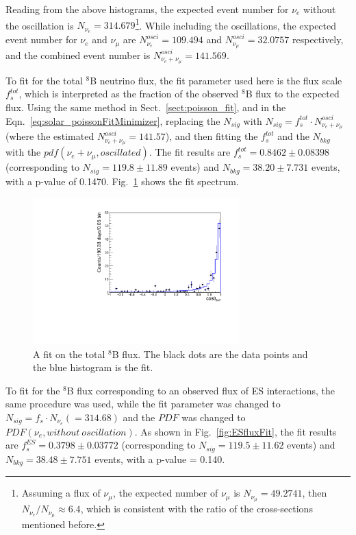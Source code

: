 Reading from the above histograms, the expected event number for $\nu_e$ without the oscillation is $N_{\nu_e} = 314.679$\footnote{Assuming a flux of $\nu_\mu$, the expected number of $\nu_\mu$ is $N_{\nu_\mu}=49.2741$, then $N_{\nu_e}/N_{\nu_\mu}\approx 6.4$, which is consistent with the ratio of the cross-sections mentioned before.}. While including the oscillations, the expected event number for $\nu_e$ and $\nu_\mu$ are $N^{osci}_{\nu_e} = 109.494$ and $N^{osci}_{\nu_\mu} = 32.0757$ respectively, and the combined event number is $N^{osci}_{\nu_e+\nu_\mu}=141.569$. %
 
To fit for the total $^8$B neutrino flux, the fit parameter used here is the flux scale $f^{tot}_s$, which is interpreted as the fraction of the observed $^8$B flux to the expected flux. Using the same method in Sect.~\ref{sect:poisson_fit}, and in the Eqn.~\ref{eq:solar_poissonFitMinimizer}, replacing the $N_{sig}$ with $N_{sig}=f^{tot}_s\cdot N^{osci}_{\nu_e+\nu_\mu}$(where the estimated $N^{osci}_{\nu_e+\nu_\mu}=141.57$), and then fitting the $f^{tot}_s$ and the $N_{bkg}$ with the $pdf(\nu_e+\nu_\mu,oscillated)$. The fit results are $f^{tot}_s=0.8462\pm 0.08398$ (corresponding to $N_{sig}=119.8\pm11.89$ events) and $N_{bkg}=38.20\pm7.731$ events, with a p-value of 0.1470. Fig.~\ref{fig:TOTALfluxFit} shows the fit spectrum.

\begin{figure}[!htb]
	\centering
	\includegraphics[width=8cm]{TotalFluxFit.pdf}
	\caption[A fit on the total $^8$B flux.]{A fit on the total $^8$B flux. The black dots are the data points and the blue histogram is the fit.}
	\label{fig:TOTALfluxFit}
\end{figure}

To fit for the $^8$B flux corresponding to an observed flux of ES interactions, the same procedure was used, while the fit parameter was changed to $N_{sig}=f_s\cdot N_{\nu_e}(=314.68)$ and the $PDF$ was changed to $PDF(\nu_e,without~oscillation)$. As shown in Fig.~\ref{fig:ESfluxFit}, the fit results are $f^{ES}_s=0.3798\pm 0.03772$ (corresponding to $N_{sig}=119.5\pm11.62$ events) and $N_{bkg}=38.48\pm 7.751$ events, with a p-value = 0.140.

